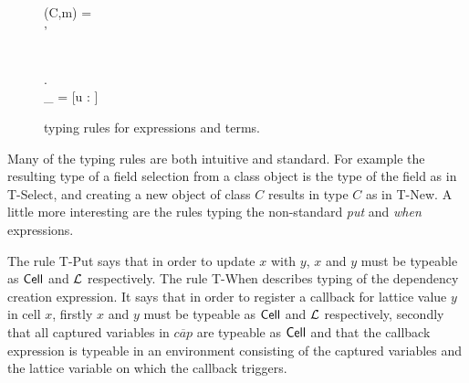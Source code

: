 \begin{figure}[h!]
    \vspace{0.5em}

    
    \vspace{0.5em}

    { \andalso \mtype(C,m) = \sigma \to \tau \\
     \andalso \sigma' \stof \sigma }
    {}
    
    \vspace{0.5em}

    { \andalso {}}
    {}
    
    \vspace{0.5em}

    { \andalso {} \\
    \forall {} \in {}. \; \\
    \Gamma_{} = [u \mapsto \CellType :  \in {}]\\
    }
    {  }

  \caption{\RACL{} typing rules for expressions and terms.}
  \label{fig:expr_typing}
\end{figure}

Many of the typing rules are both intuitive and standard. For example the
resulting type of a field selection from a class object is the type of the
field as in {\sc T-Select}, and creating a new object of class $C$ results in
type $C$ as in {\sc T-New}. A little more interesting are the rules typing the
non-standard \emph{put} and \emph{when} expressions. 

The rule {\sc T-Put} says that in order to update $x$ with $y$, $x$ and $y$ must
be typeable as $\mbox{$\mathsf{Cell}$}$ and $\mbox{$\mathcal{L}$}$ respectively. The rule {\sc T-When}
describes typing of the dependency creation expression. It says that in order to
register a callback for lattice value $y$ in cell $x$, firstly $x$ and $y$ must
be typeable as $\mbox{$\mathsf{Cell}$}$ and $\mbox{$\mathcal{L}$}$ respectively, secondly that all
captured variables in $\overline{cap}$ are typeable as $\mbox{$\mathsf{Cell}$}$ and that the
callback expression is typeable in an environment consisting of the captured
variables and the lattice variable on which the callback triggers.

